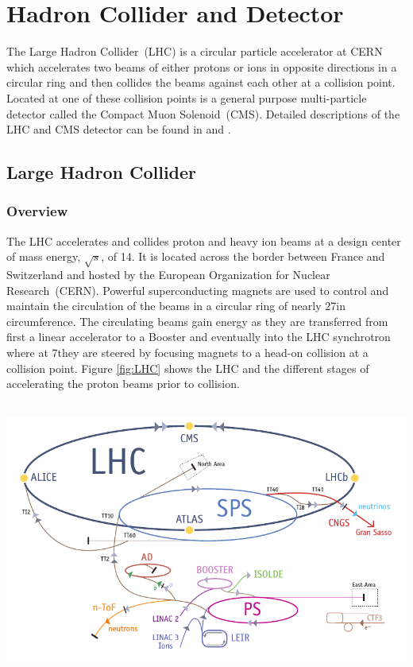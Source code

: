\chapter{Hadron Collider and Detector}
The Large Hadron Collider~(LHC) is a circular particle accelerator at CERN which accelerates two beams of either protons or ions  in opposite directions in a circular ring and then collides the beams against each other at a collision point. Located at one of these collision points is a general purpose multi-particle detector called the Compact Muon Solenoid~(CMS). Detailed descriptions of the LHC and CMS detector can be found in \cite{LHC} and \cite{CMSTDR,CMSTDR1}.
\section{Large Hadron Collider}
\subsection{Overview}
The LHC accelerates and collides proton and heavy ion beams at a design center of mass energy, $\displaystyle{\sqrt{s}}$, of 14\TeV.  It is located across the border between France and Switzerland and hosted by the European Organization for Nuclear Research~(CERN). Powerful superconducting magnets are used to control and maintain the circulation of the beams in a circular ring of nearly 27\km in circumference. The circulating beams gain energy as they are transferred from first a linear accelerator to a Booster and eventually into the LHC synchrotron where at 7\TeV they are steered by focusing magnets to a head-on collision at a collision point. Figure \ref{fig:LHC} shows the LHC and the different stages of accelerating the proton beams  prior to collision.
\begin{center}
\mbox{
\includegraphics[width=6in]{THESISPLOTS/The_LHC.png}}
\label{fig:LHC}
\end{center}
